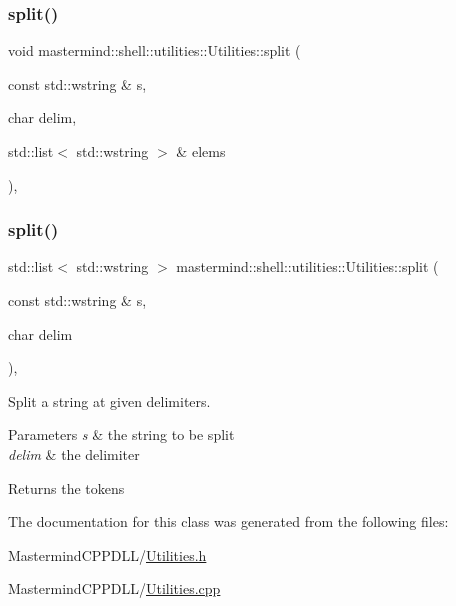 \subsubsection{\texorpdfstring{split()}{split()}\hspace{0.1cm}{\footnotesize\ttfamily [1/2]}}
{\footnotesize\ttfamily void mastermind\+::shell\+::utilities\+::\+Utilities\+::split (\begin{DoxyParamCaption}\item[{const std\+::wstring \&}]{s,  }\item[{char}]{delim,  }\item[{std\+::list$<$ std\+::wstring $>$ \&}]{elems }\end{DoxyParamCaption})\hspace{0.3cm}{\ttfamily [static]}, {\ttfamily [protected]}}

\hypertarget{classmastermind_1_1shell_1_1utilities_1_1_utilities_ac053c782cd5669535205daf989e0f695}{}\label{classmastermind_1_1shell_1_1utilities_1_1_utilities_ac053c782cd5669535205daf989e0f695} 
\subsubsection{\texorpdfstring{split()}{split()}\hspace{0.1cm}{\footnotesize\ttfamily [2/2]}}
{\footnotesize\ttfamily std\+::list$<$ std\+::wstring $>$ mastermind\+::shell\+::utilities\+::\+Utilities\+::split (\begin{DoxyParamCaption}\item[{const std\+::wstring \&}]{s,  }\item[{char}]{delim }\end{DoxyParamCaption})\hspace{0.3cm}{\ttfamily [static]}, {\ttfamily [protected]}}



Split a string at given delimiters. 


\begin{DoxyParams}{Parameters}
{\em s} & the string to be split \\
\hline
{\em delim} & the delimiter \\
\hline
\end{DoxyParams}
\begin{DoxyReturn}{Returns}
the tokens 
\end{DoxyReturn}


The documentation for this class was generated from the following files\+:\begin{DoxyCompactItemize}
\item 
Mastermind\+C\+P\+P\+D\+L\+L/\hyperlink{_utilities_8h}{Utilities.\+h}\item 
Mastermind\+C\+P\+P\+D\+L\+L/\hyperlink{_utilities_8cpp}{Utilities.\+cpp}\end{DoxyCompactItemize}
